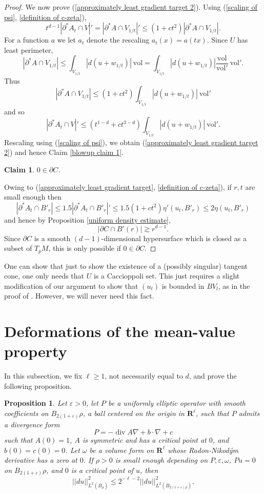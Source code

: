 \documentclass[reqno,12pt,letterpaper]{amsart}
\newcommand{\RR}{\mathbf{R}}
\DeclareMathOperator{\Div}{div}
\newcommand{\vol}{\mathrm{vol}}
\newtheorem{claim}[theorem]{Claim}
\newtheorem{proposition}[theorem]{Proposition}
\theoremstyle{definition}
\numberwithin{equation}{section}
\begin{document}
\begin{proof}
We now prove (\ref{approximately least gradient target 2}).
Using (\ref{scaling of psi}, \ref{definition of c-zeta}),
$$t^{d - 1} | \partial^* A_t \cap V|' = |\partial^* A \cap V_{1/t}|' \leq (1 + ct^2) |\partial^* A \cap V_{1/t}|.$$
For a function $a$ we let $a_t$ denote the rescaling $a_t(x) = a(tx)$.
Since $U$ has least perimeter,
$$|\partial^* A \cap V_{1/t}| \leq \int_{V_{1/t}} |d(u + w_{1/t})| ~\vol = \int_{V_{1/t}} |d(u + w_{1/t})| \frac{\vol}{\vol'} ~\vol'.$$
Thus
$$|\partial^* A \cap V_{1/t}| \leq (1 + ct^2) \int_{V_{1/t}} |d(u + w_{1/t})| ~\vol'$$
and so
$$|\partial^* A_t \cap V|' \leq (t^{1 - d} + ct^{3 - d}) \int_{V_{1/t}} |d(u + w_{1/t})| ~\vol'.$$
Rescaling using (\ref{scaling of psi}), we obtain (\ref{approximately least gradient target 2}) and hence Claim \ref{blowup claim 1}.

\begin{claim}
$0 \in \partial C$.
\end{claim}

Owing to (\ref{approximately least gradient target}, \ref{definition of c-zeta}), if $r,t$ are small enough then
$$|\partial^* A_t \cap B'_r| \leq 1.5|\partial^* A_t \cap B'_r|' \leq 1.5(1 + ct^2) \eta'(u_t, B'_r) \leq 2 \eta(u_t, B'_r)$$
and hence by Proposition \ref{uniform density estimate},
$$|\partial C \cap B'(r)| \gtrsim r^{d - 1}.$$
Since $\partial C$ is a smooth $(d-1)$-dimensional hypersurface which is closed as a subset of $T_pM$, this is only possible if $0 \in \partial C$.
\end{proof}

One can show that just to show the existence of a (possibly singular) tangent cone, one only needs that $U$ is a Caccioppoli set.
This just requires a slight modification of our argument to show that $(u_t)$ is bounded in $BV_l$, as in the proof of \cite[Theorem 9.3]{Giusti77}.
However, we will never need this fact.


\section{Deformations of the mean-value property}
In this subsection, we fix $\ell \geq 1$, not necessarily equal to $d$, and prove the following proposition.

\begin{proposition}\label{bootstrap elliptic}
Let $\varepsilon > 0$, let $P$ be a uniformly elliptic operator with smooth coefficients on $B_{2(1 + \varepsilon)}\rho$, a ball centered on the origin in $\RR^\ell$, such that $P$ admits a divergence form
$$P = -\Div A \nabla + b \cdot \nabla + c$$
such that $A(0) = 1$, $A$ is symmetric and has a critical point at $0$, and $b(0) = c(0) = 0$.
Let $\omega$ be a volume form on $\RR^\ell$ whose Radon-Nikod\'ym derivative has a zero at $0$.
If $\rho > 0$ is small enough depending on $P, \varepsilon, \omega$, $Pu = 0$ on $B_{2(1 + \varepsilon)}\rho$, and $0$ is a critical point of $u$, then
$$||du||_{L^2(B_\rho)}^2 \leq 2^{-\ell-2}||du||_{L^2(B_{2(1 + \varepsilon)\rho})}^2.$$
\end{proposition}
\end{document}
